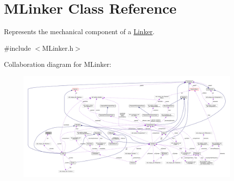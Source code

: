 \hypertarget{classMLinker}{\section{M\+Linker Class Reference}
\label{classMLinker}
}


Represents the mechanical component of a \hyperlink{classLinker}{Linker}.  




{\ttfamily \#include $<$M\+Linker.\+h$>$}



Collaboration diagram for M\+Linker\+:
\nopagebreak
\begin{figure}[H]
\begin{center}
\leavevmode
\includegraphics[width=350pt]{classMLinker__coll__graph}
\end{center}
\end{figure}
